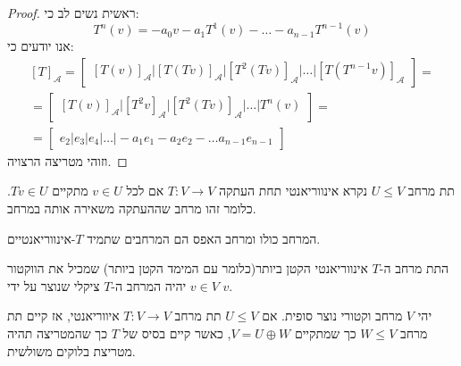 \documentclass{tstextbook}
\begin{document}
\begin{proof}
ראשית נשים לב כי:
$$T^{n}(v)=-a_{0}v-a_{1}T^{1}(v)- \dots - a_{n-1}T^{n-1}(v)$$
אנו יודעים כי:
$$\begin{gather}[T]_{\mathcal{A} }=\begin{bmatrix}[T(v)]_{\mathcal{A} } \bigg| [T(Tv)]_{\mathcal{A} } \bigg| [T^{2}(Tv)]_{\mathcal{A} }\bigg|\dots \bigg| [T(T^{n-1}v)]_{\mathcal{A} }\end{bmatrix}=  \\=\begin{bmatrix}[T(v)]_{\mathcal{A} } \bigg| [T^2 v]_{\mathcal{A} } \bigg| [T^{2}(Tv)]_{\mathcal{A} }\bigg|\dots \bigg| T^{n}(v)\end{bmatrix} =  \\= \begin{bmatrix}e_{2}\big| e_{3} \big| e_{4} \big| \dots \big| -a_{1}e_{1}-a_{2}e_{2}-\dots a_{n-1}e_{n-1}\end{bmatrix}
\end{gather}$$
וזוהי מטריצה הרצויה.

\end{proof}
\begin{definition}
תת מרחב \(U\leq V\) נקרא אינווריאנטי תחת העתקה \(T:V\to V\) אם לכל \(v \in U\) מתקיים \(Tv \in U\). כלומר זהו מרחב שההעתקה משאירה אותה במרחב.

\end{definition}
\begin{remark}
המרחב כולו ומרחב האפס הם המרחבים שתמיד \(T\)-אינווריאנטיים.

\end{remark}
\begin{proposition}
התת מרחב ה-\(T\) אינווריאנטי הקטן ביותר(כלומר עם המימד הקטן ביותר) שמכיל את הווקטור \(v \in V\) יהיה המרחב ה-\(T\) ציקלי שנוצר על ידי \(v\).

\end{proposition}
\begin{proposition}
יהי \(V\) מרחב וקטורי נוצר סופית. אם \(U\leq V\) תת מרחב \(T:V\to V\) איווריאנטי, אז קיים תת מרחב \(W\leq V\) כך שמתקיים \(V=U \oplus W\), כאשר קיים בסיס של \(T\) כך שהמטריצה תהיה מטריצת בלוקים משולשית.

\end{proposition}
\end{document}
